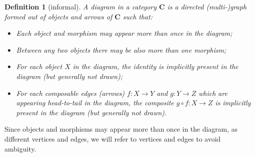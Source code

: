 \documentclass[12pt,oneside,headings=small]{scrbook}
\numberwithin{equation}{section}
\theoremstyle{plain}
\newtheorem{deph}[thm]{Definition}
\theoremstyle{definition}
\newcommand{\cat}[1]{{\mathbf{#1}}} %
\DeclareMathOperator{\1}{\mathbbm{1}}
\DeclareMathOperator{\2}{\mathbbm{2}}
\begin{document}
\begin{deph}[informal]
 A \emph{diagram} in a category $\cat{C}$ is a directed (multi-)graph formed out of objects and arrows of $\cat{C}$ such that:
 \begin{itemize}
  \item Each object and morphism may appear more than once in the diagram;
  \item Between any two objects there may be also more than one morphism;
  \item For each object $X$ in the diagram, the identity is implicitly present in the diagram (but generally not drawn);
  \item For each composable edges (arrows) $f:X\to Y$ and $g:Y\to Z$ which are appearing head-to-tail in the diagram, the composite $g\circ f:X\to Z$ is implicitly present in the diagram (but generally not drawn).
 \end{itemize}
\end{deph}

Since objects and morphisms may appear more than once in the diagram, as different vertices and edges, we will refer to vertices and edges to avoid ambiguity. 
\end{document}
